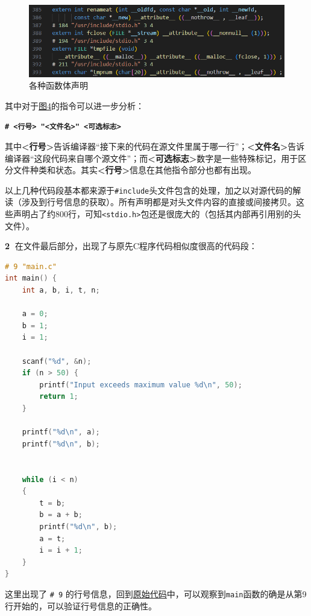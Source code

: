 \documentclass[UTF8,a4paper,10pt]{ctexart}
\begin{document}
\begin{figure} [H]
    \centering
    \includegraphics[width=0.70\linewidth]{cpp_4.png}
    \caption{各种函数体声明}
    \label{fig:placeholder}
\end{figure}

其中对于\hyperref[pic2]{\textcolor{deepblue}{图4}}的指令可以进一步分析：

\begin{center}
    \textcolor{deepred}{\textbf{\texttt{\# <行号> "<文件名>" <可选标志>}}}
\end{center}

其中\textbf{<行号>}告诉编译器“接下来的代码在源文件里属于哪一行”；\textbf{<文件名>}告诉编译器“这段代码来自哪个源文件”；而\textbf{<可选标志>}数字是一些特殊标记，用于区分文件种类和状态。其实\textbf{<行号>}信息在其他指令部分也都有出现。

以上几种代码段基本都来源于\texttt{\#include}头文件包含的处理，加之以对源代码的解读（涉及到行号信息的获取）。所有声明都是对头文件内容的直接或间接拷贝。这些声明占了约800行，可知\texttt{<stdio.h>}包还是很庞大的（包括其内部再引用别的头文件）。

\vspace{1em}

\textbf{\textcircled{2}} 在文件最后部分，出现了与原先C程序代码相似度很高的代码段：
\begin{lstlisting}[title=预处理后的C程序代码,frame=trbl,language={C++}]
# 9 "main.c"
int main() {
    int a, b, i, t, n;

    a = 0;
    b = 1;
    i = 1;

    scanf("%d", &n);
    if (n > 50) {
        printf("Input exceeds maximum value %d\n", 50);
        return 1;
    }

    printf("%d\n", a);
    printf("%d\n", b);


    while (i < n)
    {
        t = b;
        b = a + b;
        printf("%d\n", b);
        a = t;
        i = i + 1;
    }
}
\end{lstlisting}

这里出现了 \texttt{\# 9} 的行号信息，回到\hyperref[code1]{\textcolor{deepblue}{原始代码}}中，可以观察到\texttt{main}函数的确是从第9行开始的，可以验证行号信息的正确性。
\end{document}
